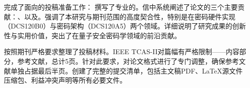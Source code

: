 \documentclass{article}
\begin{document}
完成了面向的投稿准备工作：
撰写了专业的。信中系统阐述了论文的三个主要贡献：、以及。强调了本研究与期刊范围的高度契合性，特别是在密码硬件实现（DCS120B0）与密码架构（DCS120A5）两个领域。详细说明了研究成果的创新性与实用价值，突出了在量子安全密码学领域的前沿贡献。

按照期刊严格要求整理了投稿材料。IEEE TCAS-II对篇幅有严格限制——内容部分，参考文献，总计5页。针对此要求，对论文格式进行了专门调整，确保参考文献单独占据最后半页。创建了完整的提交清单，包括主文稿PDF、LaTeX源文件压缩包、利益冲突声明等所有必要文件。


\end{document}
